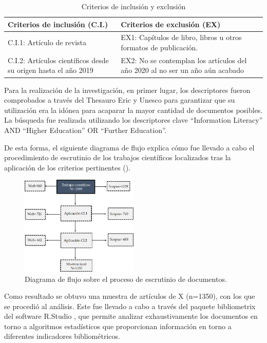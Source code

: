 \documentclass[spanish]{textolivre}
\begin{document}
\begin{table}[htpb]
\caption{Criterios de inclusión y exclusión}
\label{tab1}
\scriptsize
\begin{tabular}{p{}p{}}
\toprule 
Criterios de inclusión (C.I.) & Criterios de exclusión (EX)
\\
\midrule
C.I.1: Artículo de revista & EX1: Capítulos de libro, libros u otros formatos de publicación.
\\
C.I.2: Artículos científicos desde su origen hasta el año 2019 & EX2: No se contemplan los artículos del año 2020 al no ser un año aún acabado
\\
\bottomrule
\end{tabular}
\end{table}

Para la realización de la investigación, en primer lugar, los descriptores fueron comprobados a través del Thesauro Eric y Unesco para garantizar que su utilización era la idónea para acaparar la mayor cantidad de documentos posibles. La búsqueda fue realizada utilizando los descriptores clave “Information Literacy” AND “Higher Education”  OR “Further Education”.

De esta forma, el siguiente diagrama de flujo explica cómo fue llevado a cabo el procedimiento de escrutinio de los trabajos científicos localizados tras la aplicación de los criterios pertinentes ().

\begin{figure}[h!]
 \centering
 \includegraphics[width=0.5\textwidth]{fig1.png}
 \caption{Diagrama de flujo sobre el proceso de escrutinio de documentos.}
 \label{fig1}
\end{figure}

Como resultado se obtuvo una muestra de artículos de X (n=1350), con los que se procedió al análisis. Este fue llevado a cabo a través del paquete bibliometrix del software R.Studio \cite{aria2017}, %
que permite analizar exhaustivamente los documentos en torno a algoritmos estadísticos  que proporcionan información en torno a diferentes indicadores bibliométricos.
\end{document}
